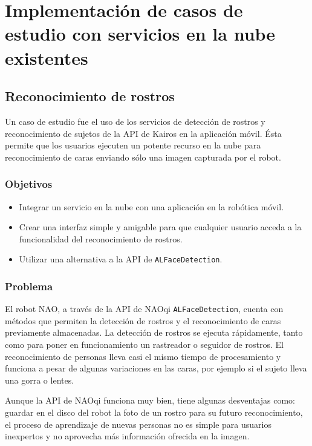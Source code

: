 
\section{Implementación de casos de estudio con servicios en la nube existentes}
\label{\detokenize{chapter_two/study_cases_implementation:implementacion-de-casos-de-estudio-con-servicios-en-la-nube-existente}}\label{\detokenize{chapter_two/study_cases_implementation::doc}}

\subsection{Reconocimiento de rostros}

Un caso de estudio fue el uso de los servicios de detección de rostros y reconocimiento de sujetos de la API de Kairos en la aplicación móvil. Ésta permite que los usuarios
ejecuten un potente recurso en la nube para reconocimiento
de caras enviando sólo una imagen capturada por el robot.

\subsubsection{Objetivos}

\begin{itemize}
    \item Integrar un servicio en la nube con una aplicación
    en la robótica móvil.
    \item Crear una interfaz simple y amigable para que cualquier usuario acceda a la funcionalidad del reconocimiento de rostros.
    \item Utilizar una alternativa a la API de \texttt{ALFaceDetection}.
\end{itemize}

\subsubsection{Problema}

El robot NAO, a través de la API de NAOqi \texttt{ALFaceDetection},
cuenta con métodos que permiten la detección de rostros
y el reconocimiento de caras previamente almacenadas.
La detección de rostros se ejecuta rápidamente, tanto como
para poner en funcionamiento un rastreador o seguidor
de rostros. El reconocimiento de personas lleva casi el 
mismo tiempo de procesamiento y funciona a pesar de algunas
variaciones en las caras, por ejemplo si el sujeto lleva 
una gorra o lentes.

Aunque la API de NAOqi funciona muy bien, tiene
algunas desventajas como: guardar en el disco del robot la foto de un 
rostro para su futuro reconocimiento, el proceso de aprendizaje 
de nuevas personas no es simple para usuarios inexpertos
y no aprovecha más información ofrecida en la imagen.

